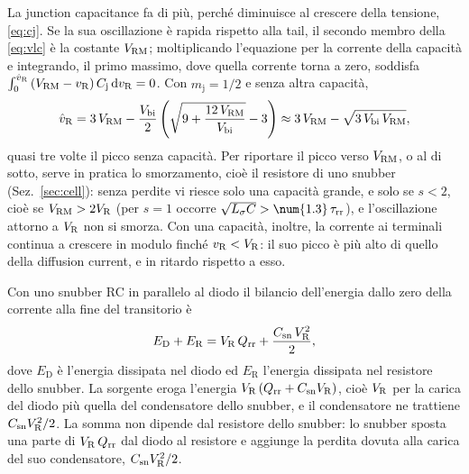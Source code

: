 \documentclass[10pt,a4paper]{scrartcl}
\let\newcommand\pdvaluedefine
\newcommand{\VR}{V_\mathrm{R}}
\newcommand{\Qrr}{Q_\mathrm{rr}}
\newcommand{\taurr}{\tau_\mathrm{rr}}
\newcommand{\Cj}{C_\mathrm{j}}
\newcommand{\Csn}{C_\mathrm{sn}}
\newcommand{\Vrm}{V_\mathrm{RM}}
\newcommand{\diff}{\mathrm{d}}
\newcommand{\Ls}{L_\sigma}                    %
\newcommand{\Vbi}{V_\mathrm{bi}}
\begin{document}
La junction capacitance fa di più, perché diminuisce al crescere della tensione, \eqref{eq:cj}. Se la sua oscillazione è rapida rispetto alla tail, il secondo membro della \eqref{eq:vlc} è la costante $\Vrm$; moltiplicando l'equazione per la corrente della capacità e integrando, il primo massimo, dove quella corrente torna a zero, soddisfa $\int_0^{\hat v_\mathrm{R}} \mbox{$(\Vrm - v_\mathrm{R})$}\,\Cj\,\diff v_\mathrm{R} = 0$. Con $m_\mathrm{j} = 1/2$ e senza altra capacità,
\begin{equation}
\hat v_\mathrm{R} = 3\,\Vrm - \frac{\Vbi}{2}\left(\sqrt{9 + \frac{12\,\Vrm}{\Vbi}} - 3\right) \approx 3\,\Vrm - \sqrt{3\,\Vbi\,\Vrm} ,
\label{eq:vpkcj}
\end{equation}
quasi tre volte il picco senza capacità. Per riportare il picco verso $\Vrm$, o al di sotto, serve in pratica lo smorzamento, cioè il resistore di uno snubber (Sez.~\ref{sec:cell}): senza perdite vi riesce solo una capacità grande, e solo se $s < 2$, cioè se $\Vrm > 2\VR$ (per $s = 1$ occorre $\sqrt{\Ls C} > \num{1.3}\,\taurr$), e l'oscillazione attorno a $\VR$ non si smorza. Con una capacità, inoltre, la corrente ai terminali continua a crescere in modulo finché $v_\mathrm{R} < \VR$: il suo picco è più alto di quello della diffusion current, e in ritardo rispetto a esso.

Con uno snubber RC in parallelo al diodo il bilancio dell'energia dallo zero della corrente alla fine del transitorio è
\begin{equation}
E_\mathrm{D} + E_\mathrm{R} = \VR\,\Qrr + \frac{\Csn\,\VR^2}{2} ,
\label{eq:ebal}
\end{equation}
dove $E_\mathrm{D}$ è l'energia dissipata nel diodo ed $E_\mathrm{R}$ l'energia dissipata nel resistore dello snubber. La sorgente eroga l'energia $\VR\,(\Qrr + \Csn\VR)$, cioè $\VR$ per la carica del diodo più quella del condensatore dello snubber, e il condensatore ne trattiene $\Csn\VR^2/2$. La somma non dipende dal resistore dello snubber: lo snubber sposta una parte di $\VR\,\Qrr$ dal diodo al resistore e aggiunge la perdita dovuta alla carica del suo condensatore, $\Csn\VR^2/2$.
\end{document}
